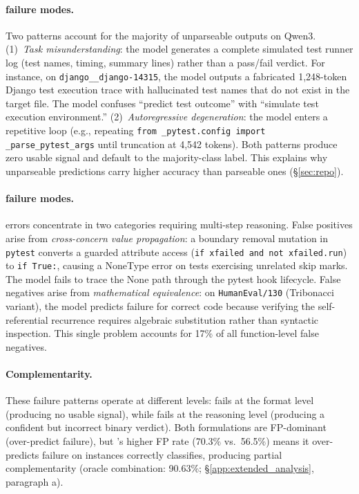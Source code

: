 \paragraph{\cwm{} failure modes.}
Two patterns account for the majority of unparseable \cwm{} outputs on Qwen3. (1)~\emph{Task misunderstanding}: the model generates a complete simulated test runner log (test names, timing, summary lines) rather than a pass/fail verdict. For instance, on \texttt{django\_\_django-14315}, the model outputs a fabricated 1,248-token Django test execution trace with hallucinated test names that do not exist in the target file. The model confuses ``predict test outcome'' with ``simulate test execution environment.'' (2)~\emph{Autoregressive degeneration}: the model enters a repetitive loop (e.g., repeating \texttt{from \_pytest.config import \_parse\_pytest\_args} until truncation at 4,542 tokens). Both patterns produce zero usable signal and default to the majority-class label. This explains why unparseable predictions carry higher accuracy than parseable ones (\S\ref{sec:repo}).

\paragraph{\cls{} failure modes.}
\cls{} errors concentrate in two categories requiring multi-step reasoning. False positives arise from \emph{cross-concern value propagation}: a boundary removal mutation in \texttt{pytest} converts a guarded attribute access (\texttt{if xfailed and not xfailed.run}) to \texttt{if True:}, causing a NoneType error on tests exercising unrelated skip marks. The model fails to trace the None path through the pytest hook lifecycle. False negatives arise from \emph{mathematical equivalence}: on \texttt{HumanEval/130} (Tribonacci variant), the model predicts failure for correct code because verifying the self-referential recurrence requires algebraic substitution rather than syntactic inspection. This single problem accounts for 17\% of all function-level false negatives.

\paragraph{Complementarity.}
These failure patterns operate at different levels: \cwm{} fails at the format level (producing no usable signal), while \cls{} fails at the reasoning level (producing a confident but incorrect binary verdict). Both formulations are FP-dominant (over-predict failure), but \cwm{}'s higher FP rate (70.3\% vs.\ 56.5\%) means it over-predicts failure on instances \cls{} correctly classifies, producing partial complementarity (oracle combination: 90.63\%; \S\ref{app:extended_analysis}, paragraph a).

